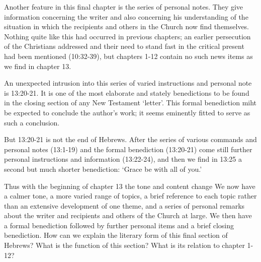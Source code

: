 Another feature in this final chapter is the series of personal notes.
They give information concerning the writer and also concerning his
understanding of the situation in which the recipients and others in the Church
now find themselves.
Nothing quite like this had occurred in previous chapters; an earlier
persecution of the Christians addressed and their need to stand fast in the
critical present had been mentioned (10:32-39), but chapters 1-12 contain no
such news items as we find in chapter 13.
\newline

An unexpected intrusion into this series of varied instructions and personal
note is 13:20-21.
It is one of the most elaborate and stately benedictions to be found in the
closing section of any New Testament `letter'.
This formal benediction miht be expected to conclude the author's work; it
seems eminently fitted to serve as such a conclusion.
\newline

But 13:20-21 is not the end of Hebrews.
After the series of various commands and personal notes (13:1-19) and the
formal benediction (13:20-21) come still further personal instructions and
information (13:22-24), and then we find in 13:25 a second but much shorter
benediction: `Grace be with all of you.'
\newline

Thus with the beginning of chapter 13 the tone and content change
We now have a calmer tone, a more varied range of topics, a brief reference to
each topic rather than an extensive development of one theme, and a series of
personal remarks about the writer and recipients and others of the Church at
large.
We then have a formal benediction followed by further personal items and a
brief closing benediction.
How can we explain the literary form of this final section of Hebrews?
What is the function of this section? What is its relation to chapter 1-12?
